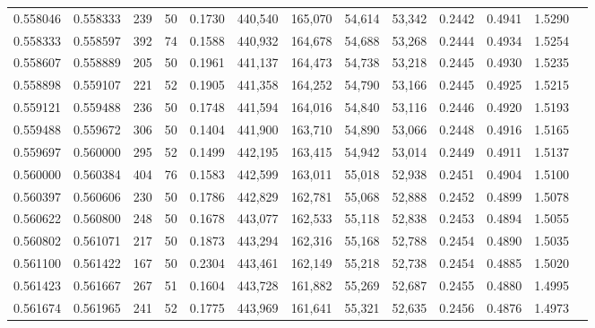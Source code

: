 \begin{tabular}{rrrrrrrrrrrrr}
0.558046 & 0.558333 &    239 &    50 &                                     0.1730 & 440,540 & 165,070 &  54,614 &  53,342 & 0.2442 & 0.4941 & 1.5290 \\
0.558333 & 0.558597 &    392 &    74 &                                     0.1588 & 440,932 & 164,678 &  54,688 &  53,268 & 0.2444 & 0.4934 & 1.5254 \\
0.558607 & 0.558889 &    205 &    50 &                                     0.1961 & 441,137 & 164,473 &  54,738 &  53,218 & 0.2445 & 0.4930 & 1.5235 \\
0.558898 & 0.559107 &    221 &    52 &                                     0.1905 & 441,358 & 164,252 &  54,790 &  53,166 & 0.2445 & 0.4925 & 1.5215 \\
0.559121 & 0.559488 &    236 &    50 &                                     0.1748 & 441,594 & 164,016 &  54,840 &  53,116 & 0.2446 & 0.4920 & 1.5193 \\
0.559488 & 0.559672 &    306 &    50 &                                     0.1404 & 441,900 & 163,710 &  54,890 &  53,066 & 0.2448 & 0.4916 & 1.5165 \\
0.559697 & 0.560000 &    295 &    52 &                                     0.1499 & 442,195 & 163,415 &  54,942 &  53,014 & 0.2449 & 0.4911 & 1.5137 \\
0.560000 & 0.560384 &    404 &    76 &                                     0.1583 & 442,599 & 163,011 &  55,018 &  52,938 & 0.2451 & 0.4904 & 1.5100 \\
0.560397 & 0.560606 &    230 &    50 &                                     0.1786 & 442,829 & 162,781 &  55,068 &  52,888 & 0.2452 & 0.4899 & 1.5078 \\
0.560622 & 0.560800 &    248 &    50 &                                     0.1678 & 443,077 & 162,533 &  55,118 &  52,838 & 0.2453 & 0.4894 & 1.5055 \\
0.560802 & 0.561071 &    217 &    50 &                                     0.1873 & 443,294 & 162,316 &  55,168 &  52,788 & 0.2454 & 0.4890 & 1.5035 \\
0.561100 & 0.561422 &    167 &    50 &                                     0.2304 & 443,461 & 162,149 &  55,218 &  52,738 & 0.2454 & 0.4885 & 1.5020 \\
0.561423 & 0.561667 &    267 &    51 &                                     0.1604 & 443,728 & 161,882 &  55,269 &  52,687 & 0.2455 & 0.4880 & 1.4995 \\
0.561674 & 0.561965 &    241 &    52 &                                     0.1775 & 443,969 & 161,641 &  55,321 &  52,635 & 0.2456 & 0.4876 & 1.4973 \\

\end{tabular}
